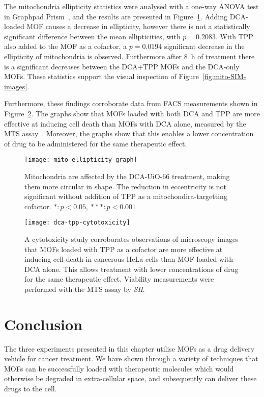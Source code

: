 The mitochondria ellipticity statistics were analysed with a one-way ANOVA test in Graphpad Prism~\cite{graphpadprism}, and the results are presented in Figure~\ref{fig:mito-ellipticity-graph}. 
Adding DCA-loaded MOF causes a decrease in ellipticity, however there is not a statistically significant difference between the mean ellipticities, with $p=0.2083$. 
With TPP also added to the MOF as a cofactor, a $p=0.0194$ significant decrease in the ellipticity of mitochondria is observed. 
Furthermore after \SI{8}{\hour} of treatment there is a significant decreases between the DCA+TPP MOFs and the DCA-only MOFs. 
These statistics support the visual inspection of Figure~\ref{fig:mito-SIM-images}. 

Furthermore, these findings corroborate data from FACS measurements shown in Figure~\ref{fig:dca-tpp-cytotoxicity}. 
The graphs show that MOFs loaded with both DCA and TPP are more effective at inducing cell death than MOFs with DCA alone, measured by the MTS assay~\cite{mosmann1983rapid, mtsassay}. 
Moreover, the graphs show that this enables a lower concentration of drug to be administered for the same therapeutic effect.

\begin{figure}[htbp!]
\centering
\texttt{[image: mito-ellipticity-graph]}
\caption[MOFs: Mitochondria become more circular when treated with DCA and TPP delivered by UiO-66 MOF] {Mitochondria are affected by the DCA-UiO-66 treatment, making them more circular in shape. The reduction in eccentricity is not significant without addition of TPP as a mitochondira-targetting cofactor. $*: p<0.05$, $***: p<0.001$} 
\label{fig:mito-ellipticity-graph}
\end{figure}

\begin{figure}[htbp!]
\centering
\texttt{[image: dca-tpp-cytotoxicity]}
\caption[MOFs: Loading MOFs with TPP as a cofactor facilitates lower drug concentration] {A cytotoxicity study corroborates observations of microscopy images that MOFs loaded with TPP as a cofactor are more effective at inducing cell death in cancerous HeLa cells than MOF loaded with DCA alone. This allows treatment with lower concentrations of drug for the same therapeutic effect. Viability measurements were performed with the MTS assay by \textit{SH}. } 
\label{fig:dca-tpp-cytotoxicity}
\end{figure}


\section{Conclusion} \label{sec:mof-conclusion}
The three experiments presented in this chapter utilise MOFs as a drug delivery vehicle for cancer treatment. 
We have shown through a variety of techniques that MOFs can be successfully loaded with therapeutic molecules which would otherwise be degraded in extra-cellular space, and subsequently can deliver these drugs to the cell. 

